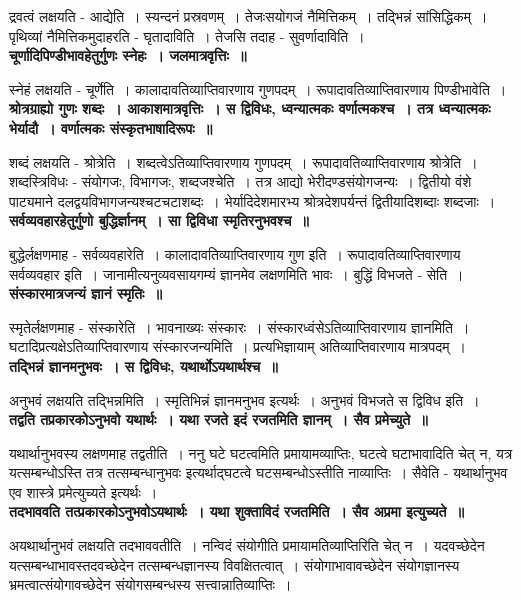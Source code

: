 	द्रवत्वं लक्षयति - आद्येति~। स्यन्दनं प्रस्रवणम्~। तेजःसयोगजं नैमित्तिकम्~। तद्भिन्नं सांसिद्धिकम्~। पृथिव्यां नैमित्तिकमुदाहरति - घृतादाविति~। तेजसि तदाह - सुवर्णादाविति~।\\[10pt]
{\bfseries चूर्णादिपिण्डीभावहेतुर्गुणः स्नेहः~। जलमात्रवृत्तिः~॥}\par
	स्नेहं लक्षयति - चूर्णेति~। कालादावतिव्याप्तिवारणाय गुणपदम्~। रूपादावतिव्याप्तिवारणाय पिण्डीभावेति~।\\[10pt]
{\bfseries श्रोत्रग्राह्यो गुणः शब्दः~। आकाशमात्रवृत्तिः~। स द्विविधः, ध्वन्यात्मकः वर्णात्मकश्च~। तत्र ध्वन्यात्मकः भेर्यादौ~। वर्णात्मकः संस्कृतभाषादिरूपः~॥}\par
	शब्दं लक्षयति - श्रोत्रेति~। शब्दत्वेऽतिव्याप्तिवारणाय गुणपदम्~। रूपादावतिव्याप्तिवारणाय श्रोत्रेति~। शब्दस्त्रिविधः - संयोगजः, विभागजः, शब्दजश्चेति~। तत्र आद्यो भेरीदण्डसंयोगजन्यः~। द्वितीयो वंशे पाट्यमाने दलद्वयविभागजन्यश्चटचटाशब्दः~। भेर्यादिदेशमारभ्य श्रोत्रदेशपर्यन्तं द्वितीयादिशब्दाः शब्दजाः~।\\[10pt]
{\bfseries सर्वव्यवहारहेतुर्गुणो बुद्धिर्ज्ञानम्~। सा द्विविधा स्मृतिरनुभवश्च~॥}\par
	बुद्धेर्लक्षणमाह - सर्वव्यवहारेति~। कालादावतिव्याप्तिवारणाय गुण इति~। रूपादावतिव्याप्तिवारणाय सर्वव्यवहार इति~। जानामीत्यनुव्यवसायगम्यं ज्ञानमेव लक्षणमिति भावः~। बुद्धिं विभजते - सेति~।\\[10pt]
{\bfseries संस्कारमात्रजन्यं ज्ञानं स्मृतिः~॥}\par
	स्मृतेर्लक्षणमाह - संस्कारेति~। भावनाख्यः संस्कारः~। संस्कारध्वंसेऽतिव्याप्तिवारणाय ज्ञानमिति~। घटादिप्रत्यक्षेऽतिव्याप्तिवारणाय संस्कारजन्यमिति~। प्रत्यभिज्ञायाम् अतिव्याप्तिवारणाय मात्रपदम्~।\\[10pt]
{\bfseries तद्भिन्नं ज्ञानमनुभवः~। स द्विविधः, यथार्थोऽयथार्थश्च~॥}\par
	अनुभवं लक्षयति तद्भिन्नमिति~। स्मृतिभिन्नं ज्ञानमनुभव इत्यर्थः~। अनुभवं विभजते स द्विविध इति~।\\[10pt]
{\bfseries तद्वति तप्रकारकोऽनुभवो यथार्थः~। यथा रजते इदं रजतमिति ज्ञानम्~। सैव प्रमेच्युते~॥}\par
	यथार्थानुभवस्य लक्षणमाह तद्वतीति~। ननु घटे घटत्वमिति प्रमायामव्याप्तिः, घटत्वे घटाभावादिति चेत् न, यत्र यत्सम्बन्धोऽस्ति तत्र तत्सम्बन्धानुभवः इत्यर्थाद्घटत्वे घटसम्बन्धोऽस्तीति नाव्याप्तिः~। सैवेति - यथार्थानुभव एव शास्त्रे प्रमेत्युच्यते इत्यर्थः~।\\[10pt]
{\bfseries तदभाववति तत्प्रकारकोऽनुभवोऽयथार्थः~। यथा शुक्ताविदं रजतमिति~। सैव अप्रमा इत्युच्यते~॥}\par
	अयथार्थानुभवं लक्षयति तदभाववतीति~। नन्विदं संयोगीति प्रमायामतिव्याप्तिरिति चेत् न~। यदवच्छेदेन यत्सम्बन्धाभावस्तदवच्छेदेन तत्सम्बन्धज्ञानस्य विवक्षितत्वात्~। संयोगाभावावच्छेदेन संयोगज्ञानस्य भ्रमत्वात्संयोगावच्छेदेन संयोगसम्बन्धस्य सत्त्वान्नातिव्याप्तिः~।\\[10pt]
